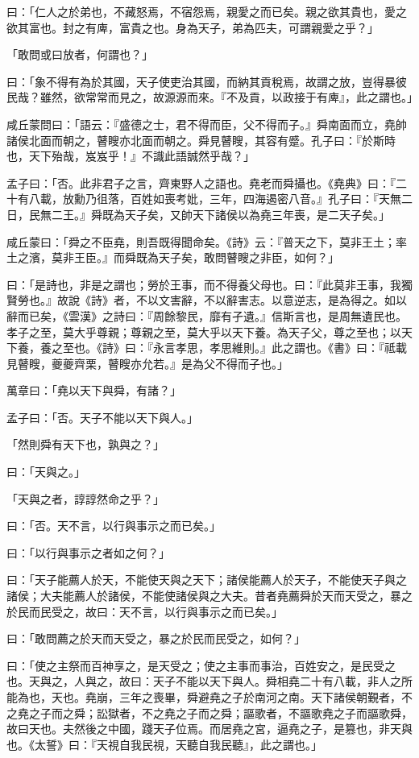 \begin{pinyinscope}
曰：「仁人之於弟也，不藏怒焉，不宿怨焉，親愛之而已矣。親之欲其貴也，愛之欲其富也。封之有庳，富貴之也。身為天子，弟為匹夫，可謂親愛之乎？」

「敢問或曰放者，何謂也？」

曰：「象不得有為於其國，天子使吏治其國，而納其貢稅焉，故謂之放，豈得暴彼民哉？雖然，欲常常而見之，故源源而來。『不及貢，以政接于有庳』，此之謂也。」

咸丘蒙問曰：「語云：『盛德之士，君不得而臣，父不得而子。』舜南面而立，堯帥諸侯北面而朝之，瞽瞍亦北面而朝之。舜見瞽瞍，其容有蹙。孔子曰：『於斯時也，天下殆哉，岌岌乎！』不識此語誠然乎哉？」

孟子曰：「否。此非君子之言，齊東野人之語也。堯老而舜攝也。《堯典》曰：『二十有八載，放勳乃徂落，百姓如喪考妣，三年，四海遏密八音。』孔子曰：『天無二日，民無二王。』舜既為天子矣，又帥天下諸侯以為堯三年喪，是二天子矣。」

咸丘蒙曰：「舜之不臣堯，則吾既得聞命矣。《詩》云：『普天之下，莫非王土；率土之濱，莫非王臣。』而舜既為天子矣，敢問瞽瞍之非臣，如何？」

曰：「是詩也，非是之謂也；勞於王事，而不得養父母也。曰：『此莫非王事，我獨賢勞也。』故說《詩》者，不以文害辭，不以辭害志。以意逆志，是為得之。如以辭而已矣，《雲漢》之詩曰：『周餘黎民，靡有孑遺。』信斯言也，是周無遺民也。孝子之至，莫大乎尊親；尊親之至，莫大乎以天下養。為天子父，尊之至也；以天下養，養之至也。《詩》曰：『永言孝思，孝思維則。』此之謂也。《書》曰：『祗載見瞽瞍，夔夔齊栗，瞽瞍亦允若。』是為父不得而子也。」

萬章曰：「堯以天下與舜，有諸？」

孟子曰：「否。天子不能以天下與人。」

「然則舜有天下也，孰與之？」

曰：「天與之。」

「天與之者，諄諄然命之乎？」

曰：「否。天不言，以行與事示之而已矣。」

曰：「以行與事示之者如之何？」

曰：「天子能薦人於天，不能使天與之天下；諸侯能薦人於天子，不能使天子與之諸侯；大夫能薦人於諸侯，不能使諸侯與之大夫。昔者堯薦舜於天而天受之，暴之於民而民受之，故曰：天不言，以行與事示之而已矣。」

曰：「敢問薦之於天而天受之，暴之於民而民受之，如何？」

曰：「使之主祭而百神享之，是天受之；使之主事而事治，百姓安之，是民受之也。天與之，人與之，故曰：天子不能以天下與人。舜相堯二十有八載，非人之所能為也，天也。堯崩，三年之喪畢，舜避堯之子於南河之南。天下諸侯朝覲者，不之堯之子而之舜；訟獄者，不之堯之子而之舜；謳歌者，不謳歌堯之子而謳歌舜，故曰天也。夫然後之中國，踐天子位焉。而居堯之宮，逼堯之子，是篡也，非天與也。《太誓》曰：『天視自我民視，天聽自我民聽』，此之謂也。」


\end{pinyinscope}
